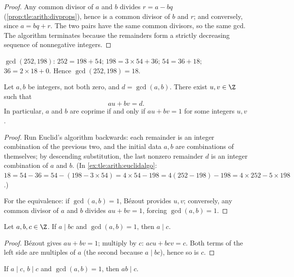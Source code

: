 \begin{proof}
Any common divisor of $a$ and $b$ divides $r = a - bq$
(\cref{prop:tle:arith:divprops}), hence is a common divisor of $b$ and $r$;
and conversely, since $a = bq + r$. The two pairs have the same common
divisors, so the same gcd. The algorithm terminates because the remainders
form a strictly decreasing sequence of nonnegative integers.
\end{proof}

\begin{example}\label{ex:tle:arith:euclidalgo}
$\gcd(252, 198)$: $252 = 198 + 54$; $198 = 3\times54 + 36$;
$54 = 36 + 18$; $36 = 2 \times 18 + 0$. Hence $\gcd(252,198) = 18$.
\end{example}

\begin{theorem}\label{thm:tle:arith:bezout}
Let $a, b$ be integers, not both zero, and $d = \gcd(a,b)$. There exist
$u, v \in \Z$ such that
\[
au + bv = d .
\]
In particular, $a$ and $b$ are coprime if and only if $au + bv = 1$ for some
integers $u, v$.
\end{theorem}

\begin{proof}
Run Euclid's algorithm backwards: each remainder is an integer combination
of the previous two, and the initial data $a, b$ are combinations of
themselves; by descending substitution, the last nonzero remainder $d$ is an
integer combination of $a$ and $b$. (In \cref{ex:tle:arith:euclidalgo}:
$18 = 54 - 36 = 54 - (198 - 3\times54) = 4\times54 - 198 =
4(252 - 198) - 198 = 4\times252 - 5\times198$.)

For the equivalence: if $\gcd(a,b) = 1$, Bézout provides $u, v$; conversely,
any common divisor of $a$ and $b$ divides $au + bv = 1$, forcing
$\gcd(a,b) = 1$.
\end{proof}

\begin{theorem}\label{thm:tle:arith:gauss}
Let $a, b, c \in \Z$. If $a \mid bc$ and $\gcd(a, b) = 1$, then $a \mid c$.
\end{theorem}

\begin{proof}
Bézout gives $au + bv = 1$; multiply by $c$: $acu + bcv = c$. Both terms of
the left side are multiples of $a$ (the second because $a \mid bc$), hence
so is $c$.
\end{proof}

\begin{corollary}\label{cor:tle:arith:coprimeprod}
If $a \mid c$, $b \mid c$ and $\gcd(a,b) = 1$, then $ab \mid c$.
\end{corollary}

